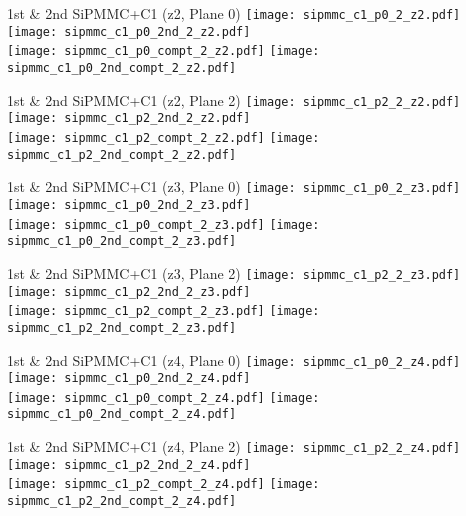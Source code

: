 \documentclass{beamer}
\begin{document}
\begin{frame}{1st \& 2nd SiPMMC+C1 (z2, Plane 0)}
	\texttt{[image: sipmmc\_c1\_p0\_2\_z2.pdf]}
	\texttt{[image: sipmmc\_c1\_p0\_2nd\_2\_z2.pdf]} \\
	
		\texttt{[image: sipmmc\_c1\_p0\_compt\_2\_z2.pdf]}
		\texttt{[image: sipmmc\_c1\_p0\_2nd\_compt\_2\_z2.pdf]} 
\end{frame}

\begin{frame}{1st \& 2nd SiPMMC+C1 (z2, Plane 2)}
	\texttt{[image: sipmmc\_c1\_p2\_2\_z2.pdf]}
	\texttt{[image: sipmmc\_c1\_p2\_2nd\_2\_z2.pdf]} \\
	
		\texttt{[image: sipmmc\_c1\_p2\_compt\_2\_z2.pdf]}
		\texttt{[image: sipmmc\_c1\_p2\_2nd\_compt\_2\_z2.pdf]}
\end{frame}

\begin{frame}{1st \& 2nd SiPMMC+C1 (z3, Plane 0)}
	\texttt{[image: sipmmc\_c1\_p0\_2\_z3.pdf]}
	\texttt{[image: sipmmc\_c1\_p0\_2nd\_2\_z3.pdf]} \\
	
		\texttt{[image: sipmmc\_c1\_p0\_compt\_2\_z3.pdf]}
		\texttt{[image: sipmmc\_c1\_p0\_2nd\_compt\_2\_z3.pdf]}
\end{frame}

\begin{frame}{1st \& 2nd SiPMMC+C1 (z3, Plane 2)}
	\texttt{[image: sipmmc\_c1\_p2\_2\_z3.pdf]}
	\texttt{[image: sipmmc\_c1\_p2\_2nd\_2\_z3.pdf]} \\
	
		\texttt{[image: sipmmc\_c1\_p2\_compt\_2\_z3.pdf]}
		\texttt{[image: sipmmc\_c1\_p2\_2nd\_compt\_2\_z3.pdf]}
\end{frame}

\begin{frame}{1st \& 2nd SiPMMC+C1 (z4, Plane 0)}
	\texttt{[image: sipmmc\_c1\_p0\_2\_z4.pdf]}
	\texttt{[image: sipmmc\_c1\_p0\_2nd\_2\_z4.pdf]} \\
	
		\texttt{[image: sipmmc\_c1\_p0\_compt\_2\_z4.pdf]}
		\texttt{[image: sipmmc\_c1\_p0\_2nd\_compt\_2\_z4.pdf]}
\end{frame}

\begin{frame}{1st \& 2nd SiPMMC+C1 (z4, Plane 2)}
	\texttt{[image: sipmmc\_c1\_p2\_2\_z4.pdf]}
	\texttt{[image: sipmmc\_c1\_p2\_2nd\_2\_z4.pdf]} \\
	
		\texttt{[image: sipmmc\_c1\_p2\_compt\_2\_z4.pdf]}
		\texttt{[image: sipmmc\_c1\_p2\_2nd\_compt\_2\_z4.pdf]}
\end{frame}
\end{document}
